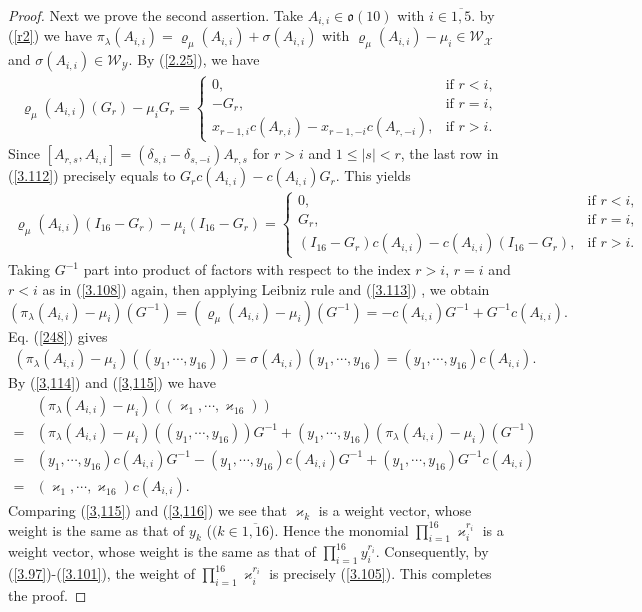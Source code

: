 \documentclass[12pt]{article}
\numberwithin{equation}{section}
\theoremstyle{definition}
\theoremstyle{remark}
\begin{document}
\begin{proof}
	Next we prove the second assertion. Take $A_{i,i}\in\mathfrak{o}(10)$ with $i\in\overline{1,5}$. by (\ref{r2}) we have $\pi_{\lambda}(A_{i,i})=\varrho_{\mu}(A_{i,i})+\sigma(A_{i,i})$ with $\varrho_{\mu}(A_{i,i})-\mu_i\in\mathscr{W}_{\mathscr{X}}$ and $\sigma(A_{i,i})\in\mathscr{W}_{\mathscr{Y}}$. By (\ref{2.25}), we have
	\begin{align}
		\varrho_{\mu}(A_{i,i})(G_r)-\mu_iG_r=\begin{cases}
			0, &\text{if }r<i,\\
			-G_r, &\text{if }r=i,\\
			x_{r-1,i}c(A_{r,i})-x_{r-1,-i}c(A_{r,-i}), &\text{if }r>i.
		\end{cases} \label{3.112}
	\end{align}
	Since $[A_{r,s},A_{i,i}]=(\delta_{s,i}-\delta_{s,-i})A_{r,s}$ for $r>i$ and $1\leqslant |s| <r$, the last row in (\ref{3.112}) precisely equals to $G_rc(A_{i,i})-c(A_{i,i})G_r$. This yields
	\begin{align}
		\varrho_{\mu}(A_{i,i})(I_{16}-G_r)-\mu_i(I_{16}-G_r)=\begin{cases}
			0, &\text{if }r<i,\\
			G_r, &\text{if }r=i,\\
			(I_{16}-G_r)c(A_{i,i})-c(A_{i,i})(I_{16}-G_r), &\text{if }r>i.
		\end{cases}\label{3.113}
	\end{align}
	Taking $G^{-1}$ part into product of factors with respect to the index $r>i$, $r=i$ and $r<i$ as in (\ref{3.108}) again, then applying Leibniz rule and (\ref{3.113}) , we obtain
	\begin{equation}
		(\pi_{\lambda}(A_{i,i})-\mu_i)(G^{-1})=(\varrho_{\mu}(A_{i,i})-\mu_i)(G^{-1})=-c(A_{i,i})G^{-1}+G^{-1}c(A_{i,i}). \label{3,114}
	\end{equation}
	Eq. (\ref{248}) gives
	\begin{eqnarray}
		(\pi_{\lambda}(A_{i,i})-\mu_i)((y_1,\cdots,y_{16}))=\sigma(A_{i,i})(y_1,\cdots,y_{16})=(y_1,\cdots,y_{16})c(A_{i,i}). \label{3,115}
	\end{eqnarray}
	By (\ref{3,114}) and (\ref{3,115}) we have
	\begin{align}
		&(\pi_{\lambda}(A_{i,i})-\mu_i)((\varkappa_1,\cdots,\varkappa_{16}))\nonumber\\
		=&(\pi_{\lambda}(A_{i,i})-\mu_i)((y_1,\cdots,y_{16}))G^{-1}+(y_1,\cdots,y_{16})(\pi_{\lambda}(A_{i,i})-\mu_i)(G^{-1})\nonumber\\
		=&(y_1,\cdots,y_{16})c(A_{i,i})G^{-1}-(y_1,\cdots,y_{16})c(A_{i,i})G^{-1}+(y_1,\cdots,y_{16})G^{-1}c(A_{i,i})\nonumber\\
		=&(\varkappa_1,\cdots,\varkappa_{16})c(A_{i,i}). \label{3,116}
	\end{align}
	Comparing (\ref{3,115}) and (\ref{3,116}) we see that $\varkappa_k$ is a weight vector, whose weight is the same as that of $y_k$ ($(k\in\overline{1,16}$).
	Hence the monomial $\prod_{i=1}^{16}\varkappa_i^{r_i}$ is a weight vector, whose weight is the same as that of $\prod_{i=1}^{16}y_i^{r_i}$. Consequently, by (\ref{3.97})-(\ref{3.101}), the weight of $\prod_{i=1}^{16}\varkappa_i^{r_i}$ is precisely (\ref{3.105}). This completes the proof.	
\end{proof}
\end{document}
